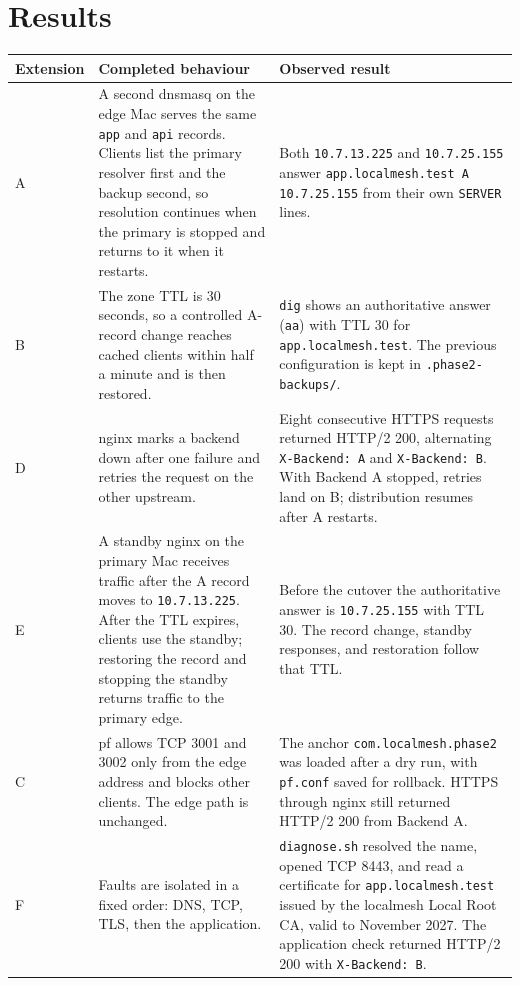 \documentclass[11pt,a4paper]{article}
\begin{document}
\section{Results}
\begin{longtable}{@{}p{2.2cm}p{5.4cm}p{6.6cm}@{}}
\toprule
\textbf{Extension} & \textbf{Completed behaviour} & \textbf{Observed result}\\
\midrule
A & A second dnsmasq on the edge Mac serves the same \texttt{app} and \texttt{api} records. Clients list the primary resolver first and the backup second, so resolution continues when the primary is stopped and returns to it when it restarts. &
Both \texttt{10.7.13.225} and \texttt{10.7.25.155} answer \texttt{app.localmesh.test A 10.7.25.155} from their own \texttt{SERVER} lines.\\
B & The zone TTL is 30 seconds, so a controlled A-record change reaches cached clients within half a minute and is then restored. &
\texttt{dig} shows an authoritative answer (\texttt{aa}) with TTL 30 for \texttt{app.localmesh.test}. The previous configuration is kept in \texttt{.phase2-backups/}.\\
D & nginx marks a backend down after one failure and retries the request on the other upstream. &
Eight consecutive HTTPS requests returned HTTP/2 200, alternating \texttt{X-Backend: A} and \texttt{X-Backend: B}. With Backend A stopped, retries land on B; distribution resumes after A restarts.\\
E & A standby nginx on the primary Mac receives traffic after the A record moves to \texttt{10.7.13.225}. After the TTL expires, clients use the standby; restoring the record and stopping the standby returns traffic to the primary edge. &
Before the cutover the authoritative answer is \texttt{10.7.25.155} with TTL 30. The record change, standby responses, and restoration follow that TTL.\\
C & pf allows TCP 3001 and 3002 only from the edge address and blocks other clients. The edge path is unchanged. &
The anchor \texttt{com.localmesh.phase2} was loaded after a dry run, with \texttt{pf.conf} saved for rollback. HTTPS through nginx still returned HTTP/2 200 from Backend A.\\
F & Faults are isolated in a fixed order: DNS, TCP, TLS, then the application. &
\texttt{diagnose.sh} resolved the name, opened TCP 8443, and read a certificate for \texttt{app.localmesh.test} issued by the localmesh Local Root CA, valid to November 2027. The application check returned HTTP/2 200 with \texttt{X-Backend: B}.\\
\bottomrule
\end{longtable}
\end{document}
